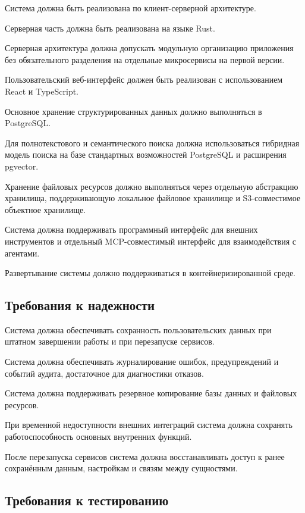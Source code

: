 Система должна быть реализована по клиент-серверной архитектуре.

Серверная часть должна быть реализована на языке Rust.

Серверная архитектура должна допускать модульную организацию приложения без обязательного разделения на отдельные микросервисы на первой версии.

Пользовательский веб-интерфейс должен быть реализован с использованием React и TypeScript.

Основное хранение структурированных данных должно выполняться в PostgreSQL.

Для полнотекстового и семантического поиска должна использоваться гибридная модель поиска на базе стандартных возможностей PostgreSQL и расширения pgvector.

Хранение файловых ресурсов должно выполняться через отдельную абстракцию хранилища, поддерживающую локальное файловое хранилище и S3-совместимое объектное хранилище.

Система должна поддерживать программный интерфейс для внешних инструментов и отдельный MCP-совместимый интерфейс для взаимодействия с агентами.

Развертывание системы должно поддерживаться в контейнеризированной среде.

\textheadingsep
\subsection{Требования к надежности}

\headingtextsep

Система должна обеспечивать сохранность пользовательских данных при штатном завершении работы и при перезапуске сервисов.

Система должна обеспечивать журналирование ошибок, предупреждений и событий аудита, достаточное для диагностики отказов.

Система должна поддерживать резервное копирование базы данных и файловых ресурсов.

При временной недоступности внешних интеграций система должна сохранять работоспособность основных внутренних функций.

После перезапуска сервисов система должна восстанавливать доступ к ранее сохранённым данным, настройкам и связям между сущностями.

\textheadingsep
\subsection{Требования к тестированию}


